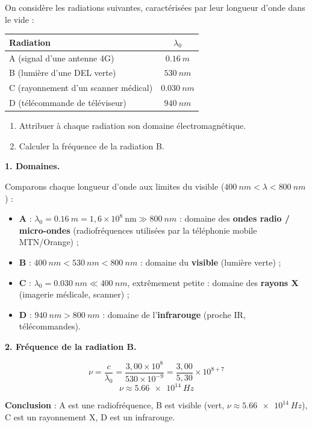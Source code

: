 \documentclass[11pt]{article}
\begin{document}
\begin{exoresolu}
On considère les radiations suivantes, caractérisées par leur longueur d'onde dans le vide :
\begin{center}
\begin{tabular}{|l|c|}
\hline
\rowcolor{popblueL} Radiation & $\lambda_0$ \\
\hline
A (signal d'une antenne 4G) & $\SI{0,16}{m}$ \\
\hline
B (lumière d'une DEL verte) & $\SI{530}{nm}$ \\
\hline
C (rayonnement d'un scanner médical) & $\SI{0,030}{nm}$ \\
\hline
D (télécommande de téléviseur) & $\SI{940}{nm}$ \\
\hline
\end{tabular}
\end{center}
\begin{enumerate}
\item Attribuer à chaque radiation son domaine électromagnétique.
\item Calculer la fréquence de la radiation B.
\end{enumerate}
\tcblower
\textbf{1. Domaines.}

Comparons chaque longueur d'onde aux limites du visible ($\SI{400}{nm} < \lambda < \SI{800}{nm}$) :
\begin{itemize}
\item \textbf{A} : $\lambda_0 = \SI{0,16}{m} = 1,6 \times 10^{8}\ \text{nm} \gg \SI{800}{nm}$ : domaine des \textbf{ondes radio / micro-ondes} (radiofréquences utilisées par la téléphonie mobile MTN/Orange) ;
\item \textbf{B} : $\SI{400}{nm} < \SI{530}{nm} < \SI{800}{nm}$ : domaine du \textbf{visible} (lumière verte) ;
\item \textbf{C} : $\lambda_0 = \SI{0,030}{nm} \ll \SI{400}{nm}$, extrêmement petite : domaine des \textbf{rayons X} (imagerie médicale, scanner) ;
\item \textbf{D} : $\SI{940}{nm} > \SI{800}{nm}$ : domaine de l'\textbf{infrarouge} (proche IR, télécommandes).
\end{itemize}

\textbf{2. Fréquence de la radiation B.}

\[ \nu = \frac{c}{\lambda_0} = \frac{3,00 \times 10^{8}}{530 \times 10^{-9}} = \frac{3,00}{5,30} \times 10^{8+7} \]
\[ \boxed{\nu \approx \SI{5,66e14}{Hz}} \]

\textbf{Conclusion} : A est une radiofréquence, B est visible (vert, $\nu \approx \SI{5,66e14}{Hz}$), C est un rayonnement X, D est un infrarouge.
\end{exoresolu}
\end{document}
